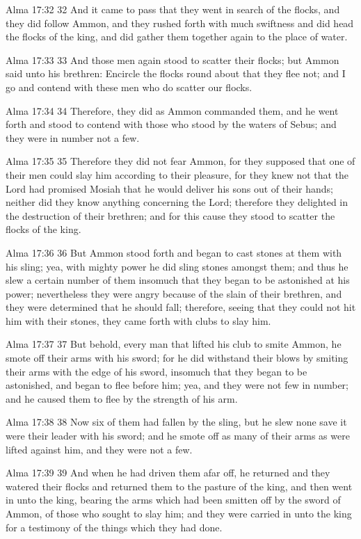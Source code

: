 Alma 17:32
 32 And it came to pass that they went in search of the flocks,
and they did follow Ammon, and they rushed forth with much
swiftness and did head the flocks of the king, and did gather
them together again to the place of water.

Alma 17:33
 33 And those men again stood to scatter their flocks; but Ammon
said unto his brethren: Encircle the flocks round about that they
flee not; and I go and contend with these men who do scatter our
flocks.

Alma 17:34
 34 Therefore, they did as Ammon commanded them, and he went
forth and stood to contend with those who stood by the waters of
Sebus; and they were in number not a few.

Alma 17:35
 35 Therefore they did not fear Ammon, for they supposed that one
of their men could slay him according to their pleasure, for they
knew not that the Lord had promised Mosiah that he would deliver
his sons out of their hands; neither did they know anything
concerning the Lord; therefore they delighted in the destruction
of their brethren; and for this cause they stood to scatter the
flocks of the king.

Alma 17:36
 36 But Ammon stood forth and began to cast stones at them with
his sling; yea, with mighty power he did sling stones amongst
them; and thus he slew a certain number of them insomuch that
they began to be astonished at his power; nevertheless they were
angry because of the slain of their brethren, and they were
determined that he should fall; therefore, seeing that they could
not hit him with their stones, they came forth with clubs to slay
him.

Alma 17:37
 37 But behold, every man that lifted his club to smite Ammon, he
smote off their arms with his sword; for he did withstand their
blows by smiting their arms with the edge of his sword, insomuch
that they began to be astonished, and began to flee before him;
yea, and they were not few in number; and he caused them to flee
by the strength of his arm.

Alma 17:38
 38 Now six of them had fallen by the sling, but he slew none
save it were their leader with his sword; and he smote off as
many of their arms as were lifted against him, and they were not
a few.

Alma 17:39
 39 And when he had driven them afar off, he returned and they
watered their flocks and returned them to the pasture of the
king, and then went in unto the king, bearing the arms which had
been smitten off by the sword of Ammon, of those who sought to
slay him; and they were carried in unto the king for a testimony
of the things which they had done.

